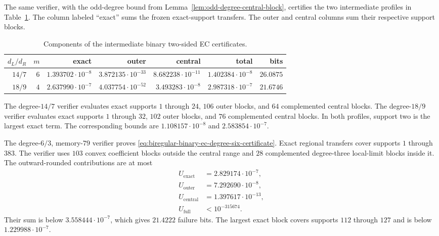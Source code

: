 The same verifier, with the odd-degree bound from
Lemma~\ref{lem:odd-degree-central-block}, certifies the two intermediate
profiles in Table~\ref{tab:binary-biregular-intermediate-certificates}.
The column labeled ``exact'' sums the frozen exact-support transfers.  The
outer and central columns sum their respective support blocks.

\begin{table}[t]
\centering
\caption{Components of the intermediate binary two-sided EC certificates.}
\label{tab:binary-biregular-intermediate-certificates}
\begin{tabular}{@{}rrrrrrr@{}}
\toprule
$d_L/d_R$ & $m$ & exact & outer & central & total & bits \\
\midrule
$14/7$ & $6$ & $1.393702\cdot10^{-8}$ & $3.872135\cdot10^{-33}$
 & $8.682238\cdot10^{-11}$ & $1.402384\cdot10^{-8}$ & $26.0875$ \\
$18/9$ & $4$ & $2.637990\cdot10^{-7}$ & $4.037754\cdot10^{-52}$
 & $3.493283\cdot10^{-8}$ & $2.987318\cdot10^{-7}$ & $21.6746$ \\
\bottomrule
\end{tabular}
\end{table}

The degree-$14/7$ verifier evaluates exact supports $1$ through $24$, $106$
outer blocks, and $64$ complemented central blocks.  The degree-$18/9$
verifier evaluates exact supports $1$ through $32$, $102$ outer blocks, and
$76$ complemented central blocks.  In both profiles, support two is the
largest exact term.  The corresponding bounds are $1.108157\cdot10^{-8}$
and $2.583854\cdot10^{-7}$.

The degree-$6/3$, memory-$79$ verifier proves
\eqref{eq:biregular-binary-ec-degree-six-certificate}.  Exact regional
transfers cover supports $1$ through $383$.  The verifier uses $103$ convex
coefficient blocks outside the central range and $28$ complemented
degree-three local-limit blocks inside it.  The outward-rounded contributions
are at most
\begin{align*}
 U_{\mathrm{exact}}&=2.829174\cdot10^{-7},\\
 U_{\mathrm{outer}}&=7.292690\cdot10^{-8},\\
 U_{\mathrm{central}}&=1.397617\cdot10^{-13},\\
 U_{\mathrm{full}}&<10^{-315674}.
\end{align*}
Their sum is below $3.558444\cdot10^{-7}$, which gives $21.4222$ failure
bits.  The largest exact block covers supports $112$ through $127$ and is
below $1.229988\cdot10^{-7}$.

